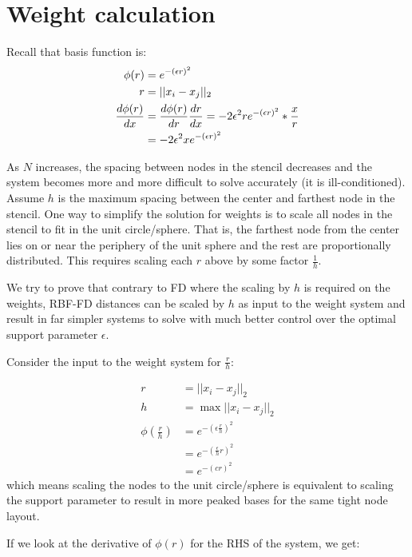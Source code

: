 \documentclass{report}
\begin{document}
\fi


\chapter{Weight calculation}

Recall that basis function is: 
\begin{align} 
\phi(r) & = e^{-(\epsilon r)^2} \\
r & = ||x_i - x_j||_2 \\ 
\frac{d \phi(r)}{d x} & = \frac{d \phi(r)}{d r} \frac{d r}{d x} = -2 \epsilon^2 r e^{-(\epsilon r)^2} * \frac{x}{r} \\
& = -2 \epsilon^2 x e^{-(\epsilon r)^2}
\end{align}

As $N$ increases, the spacing between nodes in the stencil decreases and the system becomes more and more difficult to solve accurately (it is ill-conditioned). Assume $h$ is the maximum spacing between the center and farthest node in the stencil. One way to simplify the solution for weights is to scale all nodes in the stencil to fit in the unit circle/sphere. That is, the farthest node from the center lies on or near the periphery of the unit sphere and the rest are proportionally distributed. This requires scaling each $r$ above by some factor $\frac{1}{h}$. 

We try to prove that contrary to FD where the scaling by $h$ is required on the weights, RBF-FD distances can be scaled by $h$ as input to the weight system and result in far simpler systems to solve with much better control over the optimal support parameter $\epsilon$. 

Consider the input to the weight system for $\frac{r}{h}$: 

\begin{align}
r & = ||x_i - x_j||_2 \\ 
h & = \max{||x_i - x_j||_2} \\
\phi(\frac{r}{h}) & = e^{-(\epsilon \frac{r}{h})^2} \\
 & = e^{-(\frac{\epsilon}{h} r)^2} \\
 & = e^{-(c r)^2}
\end{align}
which means scaling the nodes to the unit circle/sphere is equivalent to scaling the support parameter to result in more peaked bases for the same tight node layout.

If we look at the derivative of $\phi(r)$ for the RHS of the system, we get: 
\end{document}
